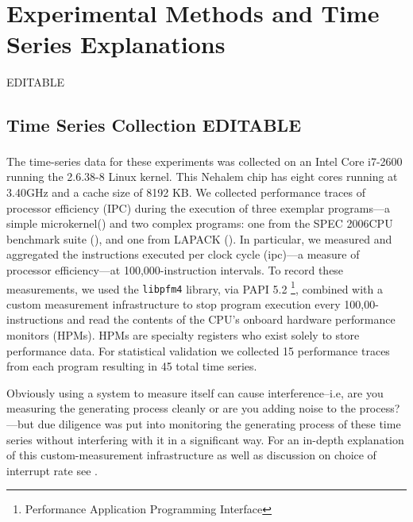 \section{Experimental Methods and Time Series Explanations}\label{sec:methods}
{\color{blue} EDITABLE}


\subsection{Time Series Collection {\color{blue} EDITABLE}}

The time-series data for these experiments was collected on an Intel Core\textsuperscript{\textregistered} i7-2600 running the 2.6.38-8 Linux
kernel.  This Nehalem chip has eight cores running at 3.40GHz and a cache size
of 8192 KB.  We collected performance traces of processor efficiency (IPC) during the execution of three exemplar programs---a simple microkernel(\col) and two complex programs: one from the
SPEC 2006CPU benchmark suite (\gcc), and one from LAPACK (\svd). In particular, we measured and aggregated the instructions executed per clock cycle (ipc)---a measure of processor efficiency---at 100,000-instruction intervals.  To record these measurements,
we used the {\tt libpfm4} library, via PAPI 5.2
\footnote{Performance Application Programming Interface}\cite{papi}, combined with a custom measurement infrastructure\cite{todd-phd} to stop program execution every 100,00-instructions and read the contents of the CPU's onboard hardware performance monitors (HPMs). HPMs are specialty registers who exist solely to store performance data.  For statistical validation we collected 15 performance traces from each program resulting in 45 total time series.


Obviously using a system to measure itself can cause interference--i.e, are you measuring the generating process cleanly or are you adding noise to the process?---but due diligence was put into monitoring the generating process of these time series without interfering with it in a significant way. For an in-depth explanation of this custom-measurement infrastructure as well as discussion on choice of interrupt rate see 
\cite{zach-IDA10,mytkowicz09,todd-phd}.


